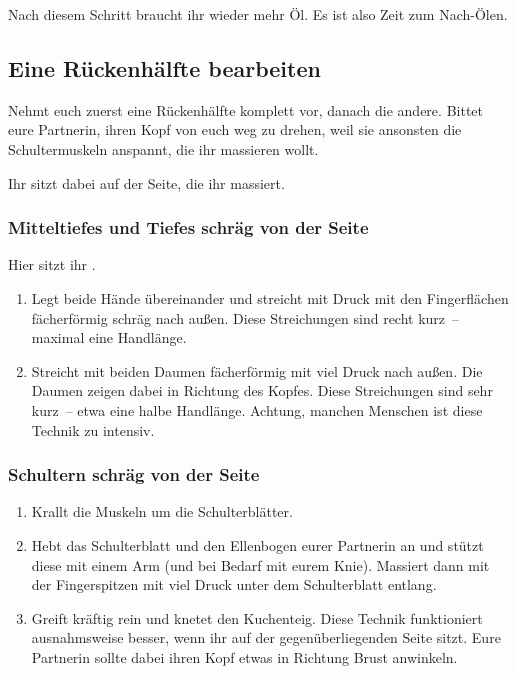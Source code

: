 Nach diesem Schritt braucht ihr wieder mehr Öl. Es ist also Zeit zum Nach-Ölen.

\subsection{Eine Rückenhälfte bearbeiten}

Nehmt euch zuerst eine Rückenhälfte komplett vor, danach die andere. Bittet eure Partnerin, ihren Kopf von euch weg zu drehen, weil sie ansonsten die Schultermuskeln anspannt, die ihr massieren wollt.

Ihr sitzt dabei auf der Seite, die ihr massiert.

\subsubsection{Mitteltiefes und Tiefes schräg von der Seite}

Hier sitzt ihr .

\begin{oframed}
  \begin{enumerate}
    \item {} Legt beide Hände übereinander und streicht mit Druck mit den Fingerflächen fächerförmig schräg nach außen. Diese Streichungen sind recht kurz~-- maximal eine Handlänge.
    \item {} Streicht mit beiden Daumen fächerförmig mit viel Druck nach außen. Die Daumen zeigen dabei in Richtung des Kopfes. Diese Streichungen sind sehr kurz~-- etwa eine halbe Handlänge. Achtung, manchen Menschen ist diese Technik zu intensiv.
  \end{enumerate}
\end{oframed}

\subsubsection{Schultern schräg von der Seite}

\begin{oframed}
  \begin{enumerate}
    \item {} Krallt die Muskeln um die Schulterblätter.
    \item {} Hebt das Schulterblatt und den Ellenbogen eurer Partnerin an und stützt diese mit einem Arm (und bei Bedarf mit eurem Knie). Massiert dann mit der Fingerspitzen mit viel Druck unter dem Schulterblatt entlang.
    \item {} Greift kräftig rein und knetet den Kuchenteig. Diese Technik funktioniert ausnahmsweise besser, wenn ihr auf der gegenüberliegenden Seite sitzt. Eure Partnerin sollte dabei ihren Kopf etwas in Richtung Brust anwinkeln.
  \end{enumerate}
\end{oframed}


